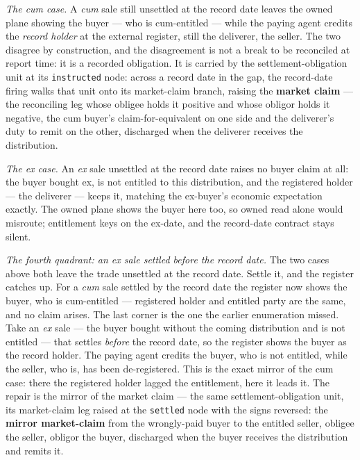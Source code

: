 \emph{The cum case.} A \emph{cum} sale still unsettled at the record date leaves the
owned plane showing the buyer --- who is cum-entitled --- while the paying agent
credits the \emph{record holder} at the external register, still the deliverer, the
seller. The two disagree by construction, and the disagreement is not a break to be
reconciled at report time: it is a recorded obligation. It is carried by the
settlement-obligation unit at its \texttt{instructed} node: across a record date in the
gap, the record-date firing walks that unit onto its market-claim branch, raising the
\textbf{market claim} --- the reconciling leg whose obligee holds it positive and whose
obligor holds it negative, the cum buyer's claim-for-equivalent on one side and the
deliverer's duty to remit on the other, discharged when the deliverer receives the
distribution.

\emph{The ex case.} An \emph{ex} sale unsettled at the record date raises no buyer
claim at all: the buyer bought ex, is not entitled to this distribution, and the
registered holder --- the deliverer --- keeps it, matching the ex-buyer's economic
expectation exactly. The owned plane shows the buyer here too, so owned read alone
would misroute; entitlement keys on the ex-date, and the record-date contract stays
silent.

\emph{The fourth quadrant: an ex sale settled before the record date.} The two cases
above both leave the trade unsettled at the record date. Settle it, and the register
catches up. For a \emph{cum} sale settled by the record date the register now shows
the buyer, who is cum-entitled --- registered holder and entitled party are the same,
and no claim arises. The last corner is the one the earlier enumeration missed. Take
an \emph{ex} sale --- the buyer bought without the coming distribution and is not
entitled --- that settles \emph{before} the record date, so the register shows the
buyer as the record holder. The paying agent credits the buyer, who is not entitled,
while the seller, who is, has been de-registered. This is the exact mirror of the cum
case: there the registered holder lagged the entitlement, here it leads it. The repair
is the mirror of the market claim --- the same settlement-obligation unit, its
market-claim leg raised at the \texttt{settled} node with the signs reversed: the
\textbf{mirror market-claim} from the wrongly-paid buyer to the entitled seller,
obligee the seller, obligor the buyer, discharged when the buyer receives the
distribution and remits it.

